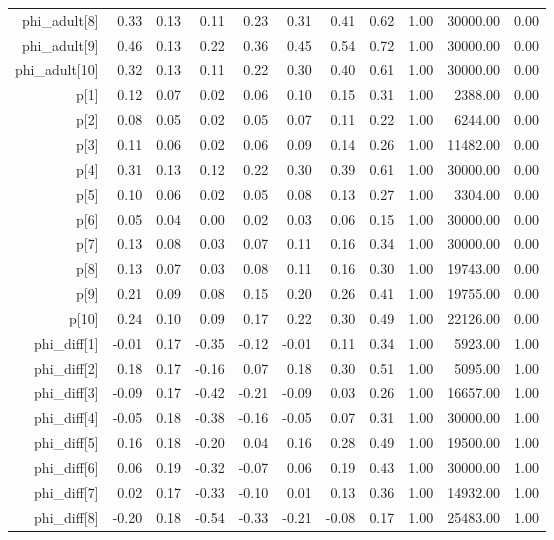 \begin{table}[ht]
\begin{tabular}{rrrrrrrrrrr}
  phi\_adult[8] & 0.33 & 0.13 & 0.11 & 0.23 & 0.31 & 0.41 & 0.62 & 1.00 & 30000.00 & 0.00 \\ 
  phi\_adult[9] & 0.46 & 0.13 & 0.22 & 0.36 & 0.45 & 0.54 & 0.72 & 1.00 & 30000.00 & 0.00 \\ 
  phi\_adult[10] & 0.32 & 0.13 & 0.11 & 0.22 & 0.30 & 0.40 & 0.61 & 1.00 & 30000.00 & 0.00 \\ 
  p[1] & 0.12 & 0.07 & 0.02 & 0.06 & 0.10 & 0.15 & 0.31 & 1.00 & 2388.00 & 0.00 \\ 
  p[2] & 0.08 & 0.05 & 0.02 & 0.05 & 0.07 & 0.11 & 0.22 & 1.00 & 6244.00 & 0.00 \\ 
  p[3] & 0.11 & 0.06 & 0.02 & 0.06 & 0.09 & 0.14 & 0.26 & 1.00 & 11482.00 & 0.00 \\ 
  p[4] & 0.31 & 0.13 & 0.12 & 0.22 & 0.30 & 0.39 & 0.61 & 1.00 & 30000.00 & 0.00 \\ 
  p[5] & 0.10 & 0.06 & 0.02 & 0.05 & 0.08 & 0.13 & 0.27 & 1.00 & 3304.00 & 0.00 \\ 
  p[6] & 0.05 & 0.04 & 0.00 & 0.02 & 0.03 & 0.06 & 0.15 & 1.00 & 30000.00 & 0.00 \\ 
  p[7] & 0.13 & 0.08 & 0.03 & 0.07 & 0.11 & 0.16 & 0.34 & 1.00 & 30000.00 & 0.00 \\ 
  p[8] & 0.13 & 0.07 & 0.03 & 0.08 & 0.11 & 0.16 & 0.30 & 1.00 & 19743.00 & 0.00 \\ 
  p[9] & 0.21 & 0.09 & 0.08 & 0.15 & 0.20 & 0.26 & 0.41 & 1.00 & 19755.00 & 0.00 \\ 
  p[10] & 0.24 & 0.10 & 0.09 & 0.17 & 0.22 & 0.30 & 0.49 & 1.00 & 22126.00 & 0.00 \\ 
  phi\_diff[1] & -0.01 & 0.17 & -0.35 & -0.12 & -0.01 & 0.11 & 0.34 & 1.00 & 5923.00 & 1.00 \\ 
  phi\_diff[2] & 0.18 & 0.17 & -0.16 & 0.07 & 0.18 & 0.30 & 0.51 & 1.00 & 5095.00 & 1.00 \\ 
  phi\_diff[3] & -0.09 & 0.17 & -0.42 & -0.21 & -0.09 & 0.03 & 0.26 & 1.00 & 16657.00 & 1.00 \\ 
  phi\_diff[4] & -0.05 & 0.18 & -0.38 & -0.16 & -0.05 & 0.07 & 0.31 & 1.00 & 30000.00 & 1.00 \\ 
  phi\_diff[5] & 0.16 & 0.18 & -0.20 & 0.04 & 0.16 & 0.28 & 0.49 & 1.00 & 19500.00 & 1.00 \\ 
  phi\_diff[6] & 0.06 & 0.19 & -0.32 & -0.07 & 0.06 & 0.19 & 0.43 & 1.00 & 30000.00 & 1.00 \\ 
  phi\_diff[7] & 0.02 & 0.17 & -0.33 & -0.10 & 0.01 & 0.13 & 0.36 & 1.00 & 14932.00 & 1.00 \\ 
  phi\_diff[8] & -0.20 & 0.18 & -0.54 & -0.33 & -0.21 & -0.08 & 0.17 & 1.00 & 25483.00 & 1.00 \\ 

\end{tabular}
\end{table}
